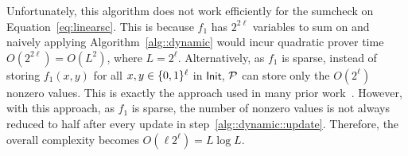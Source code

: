 Unfortunately, this algorithm does not work efficiently for the sumcheck on Equation~\ref{eq:linearsc}. This is because $f_1$ has $2^{2\ell}$ variables to sum on and naively applying Algorithm~\ref{alg::dynamic} would incur quadratic prover time $O(2^{2\ell}) = O(L^2)$, where $L = 2^\ell$. Alternatively, as $f_1$ is sparse, instead of storing $f_1(x,y)$ for all $x,y\in\binary^\ell$ in $\mathsf{Init}$, $\P$ can store only the $O(2^\ell)$ nonzero values. This is exactly the approach used in many prior work~\cite{CMT,vram,....}. However, with this approach, as $f_1$ is sparse, the number of nonzero values is not always reduced to half after every update in step~\ref{alg::dynamic::update}. Therefore, the overall complexity becomes $O(\ell 2^\ell) = L\log L$.

%

